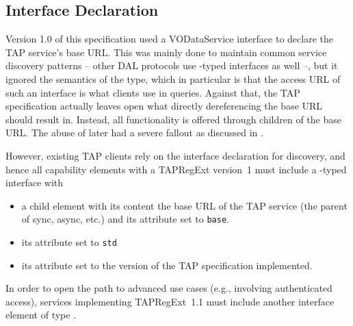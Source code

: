 \documentclass{ivoa}
\begin{document}

\subsection{Interface Declaration}
\label{intfdecl}

Version 1.0 of this specification used a VODataService
 interface to declare the TAP service's base URL.
This was mainly done to maintain common service discovery patterns --
other DAL protocols use -typed interfaces as well
--, but it ignored the semantics of the type, which in particular is
that the access URL of such an interface is what clients use in queries.
Against that, the TAP specification actually leaves open what
directly dereferencing the base URL should result in.  Instead, all
functionality is offered through children of the base URL.  The abuse of
 later had a severe fallout as discussed in
\citet{note:caproles}.

However, existing TAP clients rely on the interface declaration for
discovery, and hence all
capability elements with a TAPRegExt version~1  must include
a -typed interface with

\begin{itemize}
\item a child element  with its content the base URL of
the TAP service (the parent of sync, async, etc.) and its 
attribute set to \verb|base|.
\item its  attribute set to \verb|std|
\item its  attribute set to the version of the TAP
specification implemented.
\end{itemize}

In order to open the path to advanced use cases (e.g., involving
authenticated access), services implementing TAPRegExt~1.1 must include
another interface element of type .  
\end{document}
